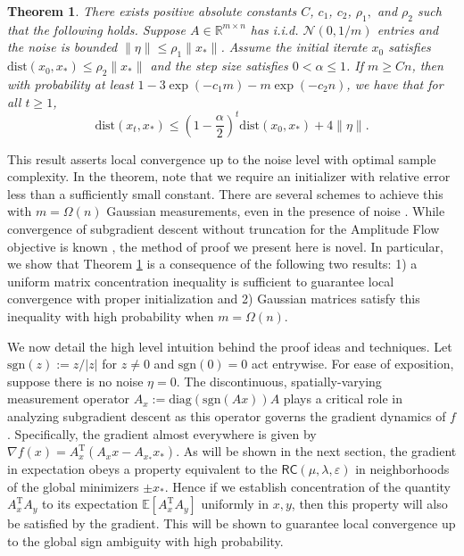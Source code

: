 \documentclass[11pt]{article}
\newcommand{\R}{\mathbb{R}}
\newcommand{\RC}{\mathsf{R}\mathsf{C}}
\newcommand{\T}{\mathrm{T}}
\newcommand{\sgn}{\text{sgn}}
\newcommand{\diag}{\text{diag}}
\newcommand{\al}{\alpha}
\renewcommand{\epsilon}{\varepsilon}
\newcommand{\E}{\mathbb{E}}
\newcommand{\dist}{\text{dist}}
\newtheorem{theorem}{Theorem}
\begin{document}
\begin{theorem} \label{main_prob_conv_result} There exists positive absolute constants $C$, $c_1$, $c_2$, $\rho_1,$ and $\rho_2$ such that the following holds. Suppose $A \in \R^{m \times n}$ has i.i.d. $\mathcal{N}(0,1/m)$ entries and the noise is bounded $\|\eta\|\leqslant \rho_1\|x_*\|$. Assume the initial iterate $x_0$ satisfies $\dist(x_0,x_*) \leqslant \rho_2\|x_*\|$ and the step size satisfies $0 < \al \leqslant 1$. If $m \geqslant C n$, then with probability at least $1 - 3\exp(-c_1 m)- m\exp(-c_2 n)$, we have that for all $t \geqslant 1$, $$\dist(x_{t},x_*) \leqslant \left(1 - \frac{\al}{2}\right)^{t}\dist(x_0,x_*) + 4\|\eta\|.$$
\end{theorem}

\noindent This result asserts local convergence up to the noise level with optimal sample complexity. In the theorem, note that we require an initializer with relative error less than a sufficiently small constant. There are several schemes to achieve this with $m = \Omega(n)$ Gaussian measurements, even in the presence of noise \cite{ChenCandes2015, AmpFlow, Wang2018, DuchiRuan2018}. While convergence of subgradient descent without truncation for the Amplitude Flow objective is known \cite{AmpFlow}, the method of proof we present here is novel. In particular, we show that Theorem \ref{main_prob_conv_result} is a consequence of the following two results: 1) a uniform matrix concentration inequality is sufficient to guarantee local convergence with proper initialization and 2) Gaussian matrices satisfy this inequality with high probability when $m = \Omega(n)$.


We now detail the high level intuition behind the proof ideas and techniques. Let $\sgn(z) := z/|z|$ for $z \neq 0$ and $\sgn(0)=0$ act entrywise. For ease of exposition, suppose there is no noise $\eta = 0$. The discontinuous, spatially-varying measurement operator $A_x := \diag(\sgn(Ax))A$ plays a critical role in analyzing subgradient descent as this operator governs the gradient dynamics of $f$. Specifically, the gradient almost everywhere is given by $\nabla f(x) = A_x^{\T}(A_x x - A_{x_*} x_*).$ As will be shown in the next section, the gradient in expectation obeys a property equivalent to the $\RC(\mu,\lambda,\epsilon)$ in neighborhoods of the global minimizers $\pm x_*$. Hence if we establish concentration of the quantity $A_x^{\T}A_y$ to its expectation $\E[A_x^{\T}A_y]$ uniformly in $x,y$, then this property will also be satisfied by the gradient. This will be shown to guarantee local convergence up to the global sign ambiguity with high probability.
\end{document}
